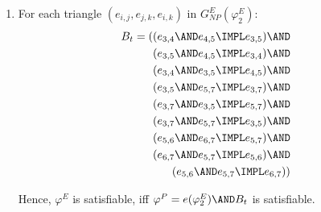 {\begin{enumerate}
\begin{enumerate}
\item For each triangle $(e_{i,j},e_{j,k},e_{i,k})$ in $G_{NP}^{E}(\varphi
_{2}^{E})$:%
\begin{eqnarray*}
B_{t}=((e_{3,4}\AND e_{4,5}\IMPL e_{3,5})\AND && \\
(e_{3,5}\AND e_{4,5}\IMPL e_{3,4})\AND && \\
(e_{3,4}\AND e_{3,5}\IMPL e_{4,5})\AND && \\
(e_{3,5}\AND e_{5,7}\IMPL e_{3,7})\AND && \\
(e_{3,7}\AND e_{3,5}\IMPL e_{5,7})\AND && \\
(e_{3,7}\AND e_{5,7}\IMPL e_{3,5})\AND && \\
(e_{5,6}\AND e_{6,7}\IMPL e_{5,7})\AND && \\
(e_{6,7}\AND e_{5,7}\IMPL e_{5,6})\AND && \\
(e_{5,6}\AND e_{5,7}\IMPL e_{6,7})) &&
\end{eqnarray*}

Hence, $\varphi ^{E}$ is satisfiable, iff $\varphi ^{P}=e(\varphi _{2}^{E})%
\AND B_{t}$ is satisfiable.
\end{enumerate}
\end{enumerate}


  }